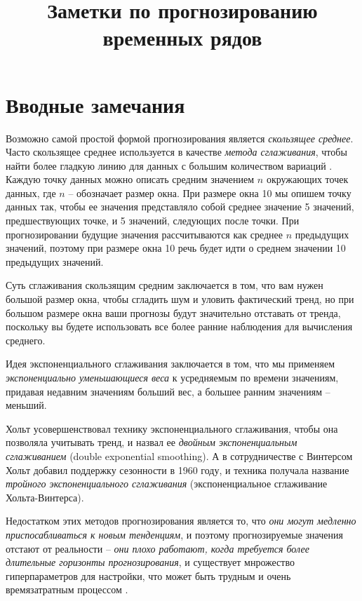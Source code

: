\documentclass[%
	11pt,
	a4paper,
	utf8,
		]{article}
\begin{document}
\title{Заметки по прогнозированию временных рядов}

\author{}

\date{}
\maketitle

\thispagestyle{fancy}

\tableofcontents

\section{Вводные замечания}

Возможно самой простой формой прогнозирования является \emph{скользящее среднее}. Часто скользящее среднее используется в качестве \emph{метода сглаживания}, чтобы найти более гладкую линию для данных с большим количеством вариаций \cite{gruzdev:time-series-2022}. Каждую точку данных можно описать средним значением $ n $ окружающих точек данных, где $ n $ -- обозначает размер окна. При размере окна 10 мы опишем точку данных так, чтобы ее значения представляло собой среднее значение 5 значений, предшествующих точке, и 5 значений, следующих после точки. При прогнозировании будущие значения рассчитываются как среднее $n$ предыдущих значений, поэтому при размере окна 10 речь будет идти о среднем значении 10 предыдущих значений.

Суть сглаживания скользящим средним заключается в том, что вам нужен большой размер окна, чтобы сгладить шум и уловить фактический тренд, но при большом размере окна ваши прогнозы будут значительно отставать от тренда, поскольку вы будете использовать все более ранние наблюдения для вычисления среднего.

Идея экспоненциального сглаживания заключается в том, что мы применяем \emph{экспоненциально уменьшающиеся веса} к усредняемым по времени значениям, придавая недавним значениям больший вес, а большее ранним значениям -- меньший.

Хольт усовершенствовал технику экспоненциального сглаживания, чтобы она позволяла учитывать тренд, и назвал ее \emph{двойным экспоненциальным сглаживанием} (double exponential smoothing). А в сотрудничестве с Винтерсом Хольт добавил поддержку сезонности в 1960 году, и техника получала название \emph{тройного экспоненциального сглаживания} (экспоненциальное сглаживание Хольта-Винтерса).

Недостатком этих методов прогнозирования является то, что \emph{\color{red}они могут медленно приспосабливаться к новым тенденциям}, и поэтому прогнозируемые значения отстают от реальности -- \emph{они плохо работают, когда требуется более длительные горизонты прогнозирования}, и существует мнрожество гиперпараметров для настройки, что может быть трудным и очень времязатратным процессом \cite[]{gruzdev:time-series-2022}.
\end{document}
